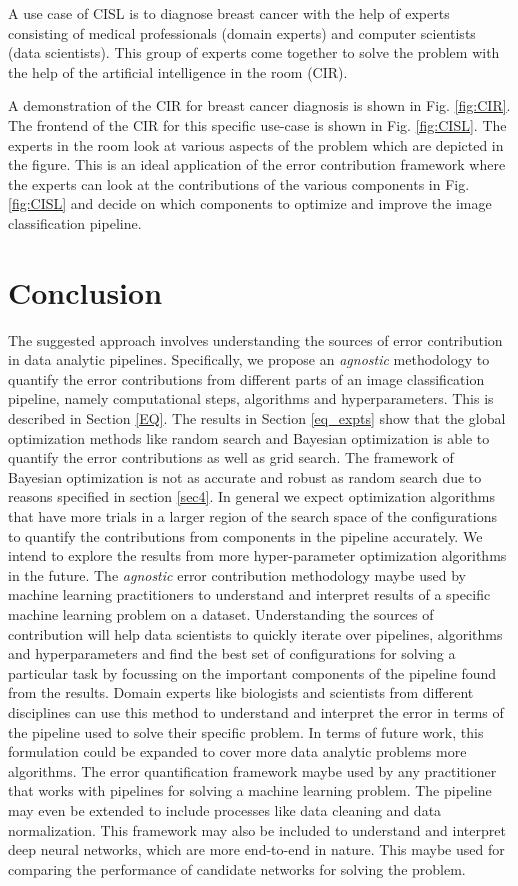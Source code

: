 A use case of CISL is to diagnose breast cancer with the help of experts consisting of medical professionals (domain experts) and computer scientists (data scientists). This group of experts come together to solve the problem with the help of the artificial intelligence in the room (CIR). 


A demonstration of the CIR for breast cancer diagnosis is shown in Fig. \ref{fig:CIR}. The frontend of the CIR for this specific use-case is shown in Fig. \ref{fig:CISL}. The experts in the room look at various aspects of the problem which are depicted in the figure. This is an ideal application of the error contribution framework where the experts can look at the contributions of the various components in Fig. \ref{fig:CISL} and decide on which components to optimize and improve the image classification pipeline.

\section{Conclusion}
  The suggested approach involves understanding the sources of error contribution in data analytic pipelines. Specifically, we propose an \textit{agnostic} methodology to quantify the error contributions from different parts of an image classification pipeline, namely computational steps, algorithms and hyperparameters. This is described in Section \ref{EQ}. The results in Section \ref{eq_expts} show that the global optimization methods like random search and Bayesian optimization is able to quantify the error contributions as well as grid search. The framework of Bayesian optimization is not as accurate and robust as random search due to reasons specified in section \ref{sec4}. In general we expect optimization algorithms that have more trials in a larger region of the search space of the configurations to quantify the contributions from components in the pipeline accurately. We intend to explore the results from more hyper-parameter optimization algorithms in the future. 
The \textit{agnostic} error contribution methodology maybe used by machine learning practitioners to understand and interpret results of a specific machine learning problem on a dataset. Understanding the sources of contribution will help data scientists to quickly iterate over pipelines, algorithms and hyperparameters and find the best set of configurations for solving a particular task by focussing on the important components of the pipeline found from the results. Domain experts like biologists and scientists from different disciplines can use this method to understand and interpret the error in terms of the pipeline used to solve their specific problem.
In terms of future work, this formulation could be expanded to cover more data analytic problems more algorithms. The error quantification framework maybe used by any practitioner that works with pipelines for solving a machine learning problem. The pipeline may even be extended to include processes like data cleaning and data normalization. This framework may also be included to understand and interpret deep neural networks, which are more end-to-end in nature. This maybe used for comparing the performance of candidate networks for solving the problem.

\label{sec5}